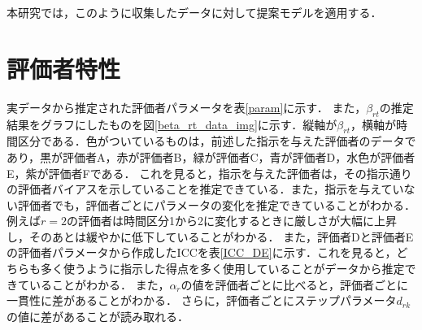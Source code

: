 \documentclass[a4paper,11pt,oneside,openany]{jsbook}
\begin{document}
本研究では，このように収集したデータに対して提案モデルを適用する．
\section{評価者特性}
実データから推定された評価者パラメータを表\ref{param}に示す．
また，$\beta_{rt}$の推定結果をグラフにしたものを図\ref{beta_rt_data_img}に示す．縦軸が$\beta_{rt}$，横軸が時間区分である．色がついているものは，前述した指示を与えた評価者のデータであり，黒が評価者A，赤が評価者B，緑が評価者C，青が評価者D，水色が評価者E，紫が評価者Fである．
これを見ると，指示を与えた評価者は，その指示通りの評価者バイアスを示していることを推定できている．また，指示を与えていない評価者でも，評価者ごとにパラメータの変化を推定できていることがわかる．例えば$r=2$の評価者は時間区分1から2に変化するときに厳しさが大幅に上昇し，そのあとは緩やかに低下していることがわかる．
また，評価者Dと評価者Eの評価者パラメータから作成したICCを表\ref{ICC_DE}に示す．これを見ると，どちらも多く使うように指示した得点を多く使用していることがデータから推定できていることがわかる．
また，$\alpha_r$の値を評価者ごとに比べると，評価者ごとに一貫性に差があることがわかる．
さらに，評価者ごとにステップパラメータ$d_{rk}$の値に差があることが読み取れる．
\end{document}
